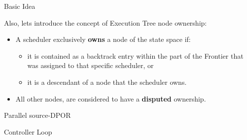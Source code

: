 \documentclass[9pt]{beamer}
\begin{document}
\begin{frame} {Basic Idea}

Also, lets introduce the concept of Execution Tree node ownership:

\begin{itemize}
  \item A scheduler exclusively \textbf{owns} a node of the state space if: 
    \begin{itemize}
    \item it is contained as a backtrack entry within the part of the Frontier that was assigned
to that specific scheduler, or
    \item it is a descendant of a node that the scheduler owns.
    \end{itemize}
  \item All other nodes, are considered to have a \textbf{disputed} ownership.
\end{itemize}

\end{frame}

\begin{frame} {Parallel source-DPOR}

\begin{algorithm}[H]
    \caption{Controller Loop}
    \label{controllerloop}

\end{algorithm}

\end{frame}
\end{document}
